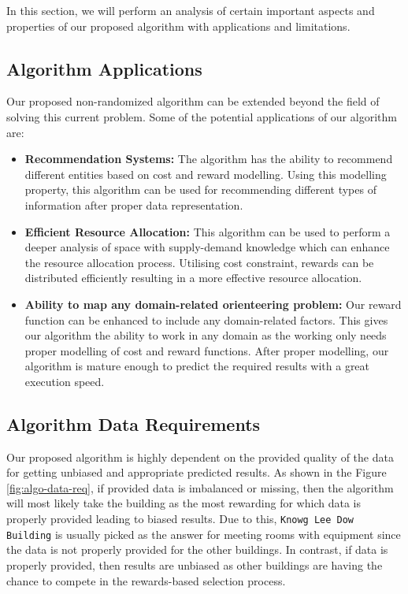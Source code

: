 In this section, we will perform an analysis of certain important aspects and properties of our proposed algorithm with applications and limitations.

\subsection{Algorithm Applications}

Our proposed non-randomized algorithm can be extended beyond the field of solving this current problem. Some of the potential applications of our algorithm are:
\begin{itemize}
    \item \textbf{Recommendation Systems:} The algorithm has the ability to recommend different entities based on cost and reward modelling. Using this modelling property, this algorithm can be used for recommending different types of information after proper data representation.
    
    \item \textbf{Efficient Resource Allocation:} This algorithm can be used to perform a deeper analysis of space with supply-demand knowledge which can enhance the resource allocation process. Utilising cost constraint, rewards can be distributed efficiently resulting in a more effective resource allocation.
    
    \item \textbf{Ability to map any domain-related orienteering problem:} Our reward function can be enhanced to include any domain-related factors. This gives our algorithm the ability to work in any domain as the working only needs proper modelling of cost and reward functions. After proper modelling, our algorithm is mature enough to predict the required results with a great execution speed.
\end{itemize}

\subsection{Algorithm Data Requirements}

Our proposed algorithm is highly dependent on the provided quality of the data for getting unbiased and appropriate predicted results. As shown in the Figure \ref{fig:algo-data-req}, if provided data is imbalanced or missing, then the algorithm will most likely take the building as the most rewarding for which data is properly provided leading to biased results. Due to this, \texttt{Knowg Lee Dow Building} is usually picked as the answer for meeting rooms with equipment since the data is not properly provided for the other buildings. In contrast, if data is properly provided, then results are unbiased as other buildings are having the chance to compete in the rewards-based selection process.

